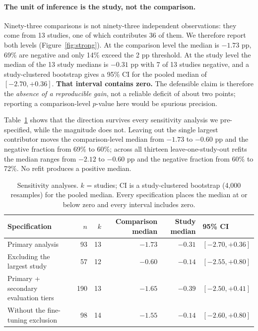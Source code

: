 \documentclass[11pt,a4paper]{article}
\begin{document}
\paragraph{The unit of inference is the study, not the comparison.} Ninety-three comparisons
is not ninety-three independent observations: they come from 13 studies, one of which
contributes 36 of them. We therefore report both levels (Figure~\ref{fig:strong}). At the
comparison level the median is $-1.73$ pp, 69\% are negative and only 14\% exceed the 2 pp
threshold. At the study level the median of the 13 study medians is $-0.31$ pp with 7 of 13
studies negative, and a study-clustered bootstrap gives a 95\% CI for the pooled median of
$[-2.70, +0.36]$. \textbf{That interval contains zero.} The defensible claim is therefore the
\emph{absence of a reproducible gain}, not a reliable deficit of about two points; reporting
a comparison-level $p$-value here would be spurious precision.

Table~\ref{tab:sens} shows that the direction survives every sensitivity analysis we
pre-specified, while the magnitude does not. Leaving out the single largest contributor
moves the comparison-level median from $-1.73$ to $-0.60$ pp and the negative fraction from
69\% to 60\%; across all thirteen leave-one-study-out refits the median ranges from $-2.12$
to $-0.60$ pp and the negative fraction from 60\% to 72\%. No refit produces a positive
median.

\begin{table}[ht]\centering\small
\caption{Sensitivity analyses. $k$ = studies; CI is a study-clustered bootstrap (4{,}000
resamples) for the pooled median. Every specification places the median at or below zero and
every interval includes zero.}
\label{tab:sens}
\begin{tabular}{lrrrrl}
\toprule
Specification & $n$ & $k$ & Comparison median & Study median & 95\% CI \\
\midrule
Primary analysis                         & 93  & 13 & $-1.73$ & $-0.31$ & $[-2.70, +0.36]$ \\
Excluding the largest study              & 57  & 12 & $-0.60$ & $-0.14$ & $[-2.55, +0.80]$ \\
Primary + secondary evaluation tiers     & 190 & 13 & $-1.65$ & $-0.39$ & $[-2.50, +0.41]$ \\
Without the fine-tuning exclusion        & 98  & 14 & $-1.55$ & $-0.14$ & $[-2.60, +0.80]$ \\
\bottomrule
\end{tabular}
\end{table}
\end{document}
